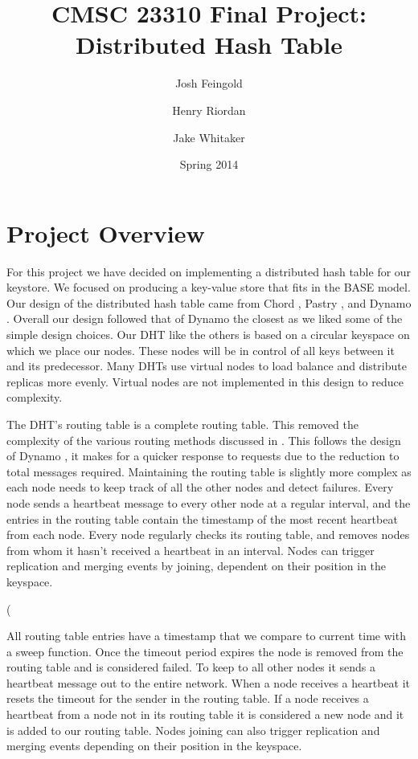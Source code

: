 \documentclass[11pt]{article}
\title{CMSC 23310 Final Project:\\
Distributed Hash Table}
\author{Josh Feingold \and Henry Riordan \and Jake Whitaker}
\date{Spring 2014}
\begin{document}
\maketitle

\section{Project Overview}\label{sec:overview}

For this project we have decided on implementing a distributed hash table for our keystore. We focused on producing a key-value store that fits in the BASE model.\cite{Fox_1997_BASE} Our design of the distributed hash table came from Chord \cite{Stoica_2003_Chord}, Pastry \cite{Rowstron_2001_Pastry}, and Dynamo \cite{DeCandia_2007_Dynamo}. Overall our design followed that of Dynamo the closest as we liked some of the simple design choices. Our DHT like the others is based on a circular keyspace on which we place our nodes. These nodes will be in control of all keys between it and its predecessor. Many DHTs use virtual nodes to load balance and distribute replicas more evenly. Virtual nodes are not implemented in this design to reduce complexity.

The DHT's routing table is a complete routing table. This removed the complexity of the various routing methods discussed in \cite{Stoica_2003_Chord, Rowstron_2001_Pastry}. This follows the design of Dynamo \cite{DeCandia_2007_Dynamo}, it makes for a quicker response to requests due to the reduction to total messages required. Maintaining the routing table is slightly more complex as each node needs to keep track of all the other nodes and detect failures. Every node sends a heartbeat message to every other node at a regular interval, and the entries in the routing table contain the timestamp of the most recent heartbeat from each node. Every node regularly checks its routing table, and removes nodes from whom it hasn't received a heartbeat in an interval. Nodes can trigger replication and merging events by joining, dependent on their position in the keyspace.

(

All routing table entries have a timestamp that we compare to current time with a sweep function. Once the timeout period expires the node is removed from the routing table and is considered failed. To keep to all other nodes it sends a heartbeat message out to the entire network. When a node receives a heartbeat it resets the timeout for the sender in the routing table. If a node receives a heartbeat from a node not in its routing table it is considered a new node and it is added to our routing table. Nodes joining can also trigger replication and merging events depending on their position in the keyspace.
\end{document}
